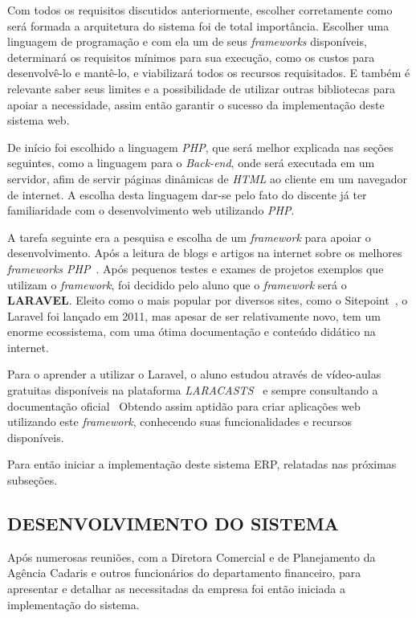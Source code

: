 \documentclass[
  12pt,				%
  openany,
  oneside,
  a4paper,			%
  english,			%
  brazil
]{article}
\numberwithin{figure}{section}
\numberwithin{table}{section}
\begin{document}
Com todos os requisitos discutidos anteriormente, escolher corretamente como será formada a arquitetura do sistema foi de total importância. Escolher uma linguagem de programação e com ela um de seus \textit{frameworks} disponíveis, determinará os requisitos mínimos para sua execução, como os custos para desenvolvê-lo e mantê-lo, e viabilizará todos os recursos requisitados. E também é relevante saber seus limites e a possibilidade de utilizar outras bibliotecas para apoiar a necessidade, assim então garantir o sucesso da implementação deste sistema web.

De início foi escolhido a linguagem \textit{PHP}, que será melhor explicada nas seções seguintes, como a linguagem para o \textit{Back-end}, onde será executada em um servidor, afim de servir páginas dinâmicas de \textit{HTML} ao cliente em um navegador de internet. A escolha desta linguagem dar-se pelo fato do discente já ter familiaridade com o desenvolvimento web utilizando \textit{PHP}.

A tarefa seguinte era a pesquisa e escolha de um \textit{framework} para apoiar o desenvolvimento. Após a leitura de blogs e artigos na internet sobre os melhores \textit{frameworks PHP}~\cite{top10}. Após pequenos testes e exames de projetos exemplos que utilizam o \textit{framework}, foi decidido pelo aluno que o \textit{framework} será o \textbf{LARAVEL}. Eleito como o mais popular por diversos sites, como o Sitepoint~\cite{sitepoint}, o Laravel foi lançado em 2011, mas apesar de ser relativamente novo, tem um enorme ecossistema, com uma ótima documentação e conteúdo didático na internet.

Para o aprender a utilizar o Laravel, o aluno estudou através de vídeo-aulas gratuitas disponíveis na plataforma \textit{LARACASTS}~\cite{laracast} e sempre consultando a documentação oficial~\cite{laraveldocs} Obtendo assim aptidão para criar aplicações web utilizando este \textit{framework}, conhecendo suas funcionalidades e recursos disponíveis.

Para então iniciar a implementação deste sistema ERP, relatadas nas próximas subseções.


\subsection{DESENVOLVIMENTO DO SISTEMA}

Após numerosas reuniões, com a Diretora Comercial e de Planejamento da Agência Cadaris e outros funcionários do departamento financeiro, para apresentar e detalhar as necessitadas da empresa foi então iniciada a implementação do sistema. 
\end{document}
